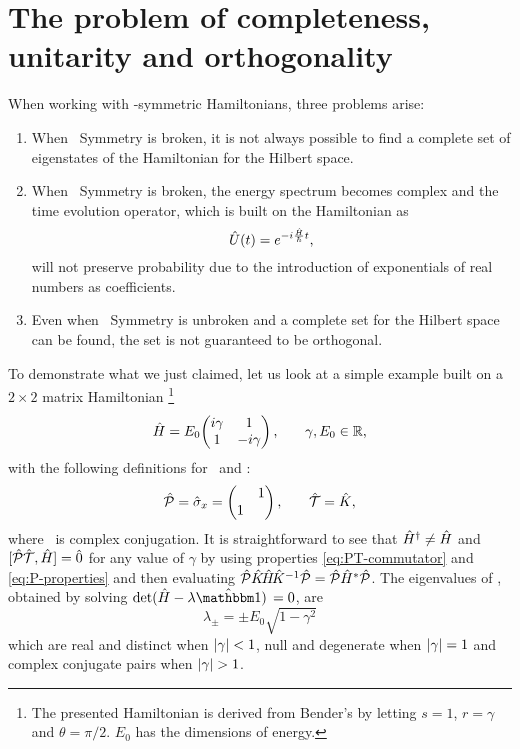     \section{The problem of completeness, unitarity and orthogonality}\label{s:problem}
        When working with \PT-symmetric Hamiltonians, three problems arise:
        \begin{enumerate}[label = \mybullet]
            \item When \PT\ Symmetry is broken, it is not always possible to find a complete set of eigenstates of the Hamiltonian for the Hilbert space.
            \item When \PT\ Symmetry is broken, the energy spectrum becomes complex and the time evolution operator, which is built on the Hamiltonian as 
            \begin{equation}
                \label{eq:time-evolution}
                \hU\pqty{t} = \myexp{-i\frac{\hH}{\hbar}t}
                \mycomma
            \end{equation}
            will not preserve probability due to the introduction of exponentials of real numbers as coefficients.
            \item Even when \PT\ Symmetry is unbroken and a complete set for the Hilbert space can be found, the set is not guaranteed to be orthogonal.
        \end{enumerate}
        To demonstrate what we just claimed, let us look at a simple example built on a $2\times2$ matrix Hamiltonian \cite{Bender2005,Bender2007}\footnote{The presented Hamiltonian is derived from Bender's by letting $s = 1$, $r = \gamma$ and $\theta = \pi/2$. $E_0$ has the dimensions of energy.}
        \begin{equation}
            \label{eq:ex:reduced-2x2-hamiltonian}
            \hH = E_0\! \pmqty{\dmat[1]{i\gamma, -i\gamma}}
            \mycomma\qquad
            \gamma,E_0\in\bbR
            \mycomma
        \end{equation}
        with the following definitions for \hP\ and \hT :
        \begin{equation}
            \label{eq:ex:reduced-2x2-P-T}
            \hP = \hat{\sigma}_x = \pmqty{\admat{1,1}}
            \mycomma\qquad
            \hT = \hK
            \mycomma
        \end{equation}
        where \hK\ is complex conjugation. It is straightforward to see that $\hat{H}^\dag \neq \hat{H}$ and $\comm*{\hPT}{\hH}\! = \hzero$ for any value of $\gamma$ by using properties \eqref{eq:PT-commutator} and \eqref{eq:P-properties} and then evaluating $\mathcal{\hat{P}}\hat{K}\!\hat{H}\!\hat{K}^{-1}\mathcal{\hat{P}} = \mathcal{\hat{P}}\hat{H}^*\mathcal{\hat{P}}$. The eigenvalues of \hH, obtained by solving $\det\!\pqty*{\hH - \lambda\hidM} = 0$, are
        \begin{equation*}
            \lambda_\pm = \pm E_0 \sqrt{1-\gamma^2}
        \end{equation*}
        which are real and distinct when $\abs{\gamma} < 1$, null and degenerate when $\abs{\gamma} = 1$ and complex conjugate pairs when $\abs{\gamma} > 1$.
        
